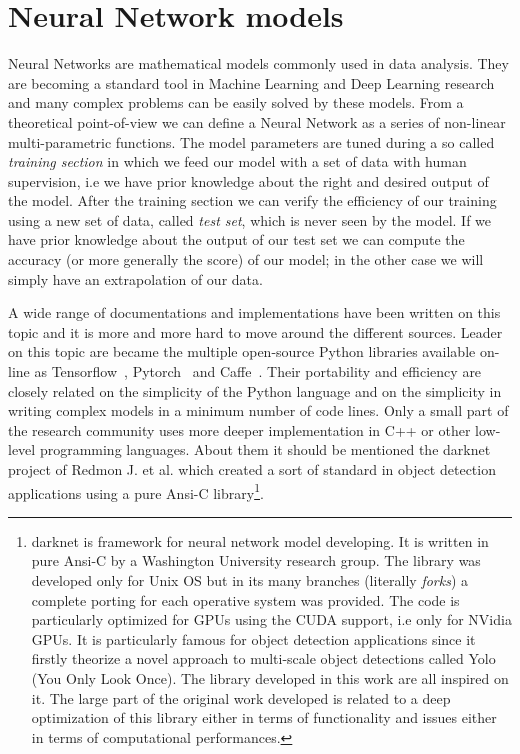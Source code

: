 \documentclass{standalone}
\begin{document}
\section[Neural Network models]{Neural Network models}\label{NN:nn}

Neural Networks are mathematical models commonly used in data analysis.
They are becoming a standard tool in Machine Learning and Deep Learning research and many complex problems can be easily solved by these models.
From a theoretical point-of-view we can define a Neural Network as a series of non-linear multi-parametric functions.
The model parameters are tuned during a so called \emph{training section} in which we feed our model with a set of data with human supervision, i.e we have prior knowledge about the right and desired output of the model.
After the training section we can verify the efficiency of our training using a new set of data, called \emph{test set}, which is never seen by the model.
If we have prior knowledge about the output of our test set we can compute the accuracy (or more generally the score) of our model; in the other case we will simply have an extrapolation of our data.

A wide range of documentations and implementations have been written on this topic and it is more and more hard to move around the different sources.
Leader on this topic are became the multiple open-source Python libraries available on-line as \textsf{Tensorflow}~\cite{tensorflow2015-whitepaper}, \textsf{Pytorch}~\cite{paszke2017automatic} and \textsf{Caffe}~\cite{Jia:2014:Caffe}.
Their portability and efficiency are closely related on the simplicity of the Python language and on the simplicity in writing complex models in a minimum number of code lines.
Only a small part of the research community uses more deeper implementation in \textsf{C++} or other low-level programming languages.
About them it should be mentioned the \textsf{darknet project} of Redmon J. et al. which created a sort of standard in object detection applications using a pure Ansi-C library\footnote{
  \textsf{darknet} is framework for neural network model developing.
  It is written in pure Ansi-C by a Washington University research group.
  The library was developed only for Unix OS but in its many branches (literally \emph{forks}) a complete porting for each operative system was provided.
  The code is particularly optimized for GPUs using the CUDA support, i.e only for NVidia GPUs.
  It is particularly famous for object detection applications since it firstly theorize a novel approach to multi-scale object detections called Yolo (You Only Look Once).
  The library developed in this work are all inspired on it.
  The large part of the original work developed is related to a deep optimization of this library either in terms of functionality and issues either in terms of computational performances.
}.
\end{document}
